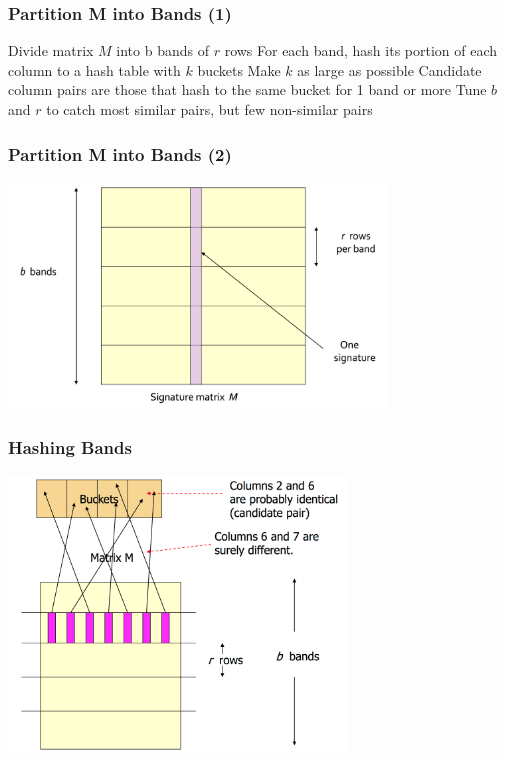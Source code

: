 \documentclass[svgnames]{beamer}
\begin{document}
  
\begin{frame} \frametitle{Partition M into Bands (1)}

Divide matrix $M$ into b bands of $r$ rows
For each band, hash its portion of each column to a hash table with $k$ buckets
Make $k$ as large as possible
Candidate column pairs are those that hash to the same bucket for 1 band or more
Tune $b$ and $r$ to catch most similar pairs, but few non-similar pairs

\end{frame}

  
\begin{frame} \frametitle{Partition M into Bands (2)}

\includegraphics[width=10cm]{bands}

\end{frame}

  
\begin{frame} \frametitle{Hashing Bands}

\includegraphics[width=9cm]{hashing-bands}

\end{frame}
\end{document}

